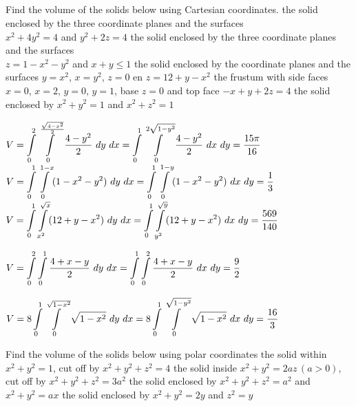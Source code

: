 \subsection*{}
\begin{Exercise} Find the volume of the solids below using Cartesian coordinates.
        \Question[difficulty = 2] the solid enclosed by the three coordinate planes and the surfaces \\ $x^2+4y^2=4$ and $y^2+2z=4$
        \Question[difficulty = 2] the solid enclosed by the three coordinate planes and the surfaces \\ $z=1-x^2-y^2$ and $x+y \leq 1$
        \Question[difficulty = 3]the solid enclosed by the coordinate   planes  and the surfaces $y=x^2$, $x=y^2$, $z=0$ en $z=12 + y - x^2$
        \Question[difficulty = 3] the frustum with  side faces $x=0$, $x=2$, $y=0$, $y=1$,  base $z=0$ and top face $-x+y+2z=4$ 
        \Question[difficulty = 2] the solid enclosed by $x^2+y^2=1$ and $x^2+z^2=1$ 
\end{Exercise}

\begin{Answer}
    
        \Question
        $V = \ds \int\limits_0^2 \ds \int\limits_0^{\frac{\sqrt{4-x^2}}{2}} \dfrac{4-y^2}{2} \ dy \ dx   = \ds \int\limits_0^1 \ds \int\limits_0^{2\sqrt{1-y^2}} \dfrac{4-y^2}{2} \ dx\ dy = \dfrac{15 \pi}{16}$
        \Question $V =\displaystyle \int\limits_0^1 \displaystyle \int\limits_0^{1-x} (1-x^2-y^2) \ dy \ dx= \displaystyle \int\limits_0^1 \displaystyle \int\limits_0^{1-y} (1-x^2-y^2) \ dx \ dy = \dfrac{1}{3}$
        \Question $V = \displaystyle \int\limits_0^1 \displaystyle \int\limits_{x^2}^{\sqrt{x}} (12+y-x^2) \ dy \ dx=  \displaystyle \int\limits_0^1\displaystyle \int\limits_{y^2}^{\sqrt{y}} (12+y-x^2) \ dx \ dy = \dfrac{569}{140}$

        \Question $V = \displaystyle \int\limits_0^2 \displaystyle \int\limits_{0}^{1} \dfrac{4+x-y}{2} \ dy\  dx=  \displaystyle \int\limits_0^1\displaystyle \int\limits_{0}^{2} \dfrac{4+x-y}{2}  \ dx\  dy = \dfrac{9}{2} $
        
        \Question $V = 8 \ds \int\limits_0^1 \ds \int\limits_{0}^{\sqrt{1-x^2}} \sqrt{1-x^2} \ dy\  dx = 8 \ds \int\limits_0^1\ds \int\limits_{0}^{\sqrt{1-y^2}} \sqrt{1-x^2}  \ dx\  dy = \dfrac{16}{3} $
         
    
\end{Answer}

\begin{Exercise} Find the volume of the solids below using polar coordinates
     \Question[difficulty = 2] the solid within $x^2+y^2=1$, cut off by $x^2+y^2+z^2=4$ 
     \Question[difficulty = 3] the solid inside $x^2+y^2=2az\, (a>0)$, cut off by $x^2+y^2+z^2=3a^2$ 
     \Question[difficulty = 2] the solid enclosed by $x^2+y^2+z^2=a^2$ and $x^2+y^2=ax$ 
     \Question[difficulty = 3] the solid enclosed by $x^2+y^2=2y$ and $z^2=y$ 
\end{Exercise}


